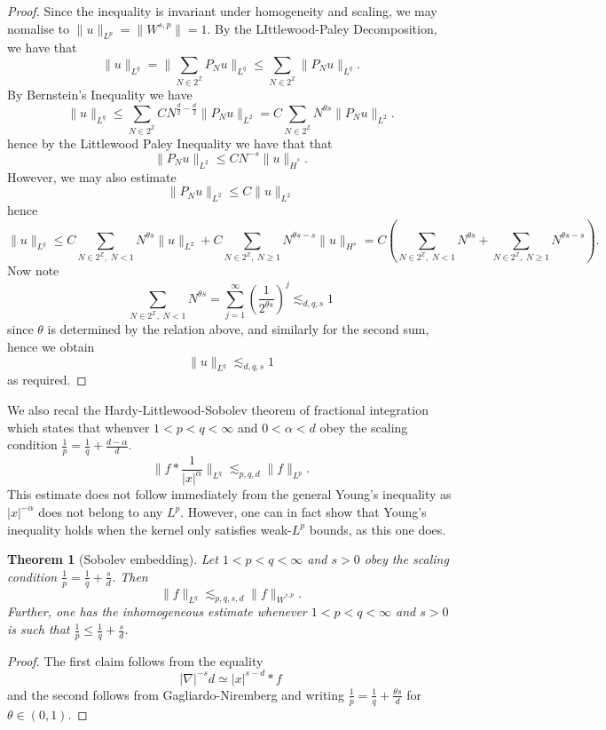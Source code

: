 \documentclass[11pt]{article}
\newtheorem{thm}{Theorem}
\theoremstyle{remark}
\newcommand{\1}{\textbf{1}}
\newcommand{\lle}{\lesssim}
\def\norm#1{\| #1  \|}
\begin{document}
\begin{proof}
Since the inequality is invariant under homogeneity and scaling, we may nomalise to $\norm{u}_{L^p} = \norm{W^{s,p}} = 1$. By the LIttlewood-Paley Decomposition, we have that
\[
\|u\|_{L^q} = \| \sum_{N \in 2^{\mathbb{Z}}} P_N u\|_{L^q}  \leq \sum_{N \in 2^{\mathbb{Z}}} \| P_N u\|_{L^q} .
\]
By Bernstein's Inequality we have
\[
\|u\|_{L^q} \leq \sum_{N \in 2^{\mathbb{Z}}} CN^{\frac{d}{2} - \frac{d}{2}}\| P_N u\|_{L^2} =  C \sum_{N \in 2^{\mathbb{Z}}} N^{\theta s} \| P_N u\|_{L^2}.
\] 
hence by the Littlewood Paley Inequality we have that that
\[
\| P_N u\|_{L^2} \leq C N^{-s} \|u\|_{\dot H^s}.
\]
However, we may also estimate
\[
\| P_N u\|_{L^2} \leq C \|u\|_{L^2}
\]
hence
\[
\|u\|_{L^q} \leq C \sum_{N \in 2^{\mathbb{Z}},\; N<1 } N^{\theta s}\|u\|_{L^2} + C \sum_{N \in 2^{\mathbb{Z}},\; N\geq1 } N^{\theta s-s}\|u\|_{\overset{\cdot}{H^s}} = C \left(\sum_{N \in 2^{\mathbb{Z}},\; N <1 } N^{\theta s} + \sum_{N \in 2^{\mathbb{Z}},\; N\geq1 } N^{\theta s-s} \right).
\]
Now note
\[
\sum_{N \in 2^{\mathbb{Z}},\; N <1 } N^{\theta s} = \sum_{j=1}^\infty \left( \frac{1}{2^{\theta s}} \right)^j \lle_{d,q,s} 1
\]
since $\theta$ is determined by the relation above, and similarly for the second sum, hence we obtain
\[
\|u\|_{L^q}  \lle_{d,q,s} 1
\]
as required.
\end{proof}
We also recal the Hardy-Littlewood-Sobolev theorem of fractional integration which states that whenver $1 < p< q < \infty$ and $0 < \alpha < d$ obey the scaling condition $\frac{1}{p} = \frac{1}{q} + \frac{d- \alpha}{d}$.
\[
\norm{f * \frac{1}{|x|^\alpha}}_{L^q} \lle_{p,q,d} \norm{f}_{L^p}.
\]
This estimate does not follow immediately from the general Young's inequality as $|x|^{-\alpha}$ does not belong to any $L^p$. However, one can in fact show that Young's inequality holds when the kernel only satisfies weak-$L^p$ bounds, as this one does.
\begin{thm}[Sobolev embedding]
Let $1 < p < q < \infty$ and $s > 0$ obey the scaling condition $\frac{1}{p} = \frac{1}{q} + \frac{s}{d}$. Then
\[
\norm{f}_{L^q} \lle_{p,q, s,d} \norm{f}_{\dot W^{s,p}}.
\]
Further, one has the inhomogeneous estimate whenever $1 < p < q < \infty$ and $s > 0$ is such that $\frac{1}{p} \leq \frac{1}{q} + \frac{s}{d}$. 
\end{thm}
\begin{proof}
The first claim follows from the equality
\[
|\nabla|^{-s} d \simeq |x|^{s-d} * f
\]
and the second follows from Gagliardo-Niremberg and writing $\frac{1}{p} = \frac{1}{q} + \frac{\theta s}{d}$ for $\theta \in (0,1)$.
\end{proof}
\end{document}
